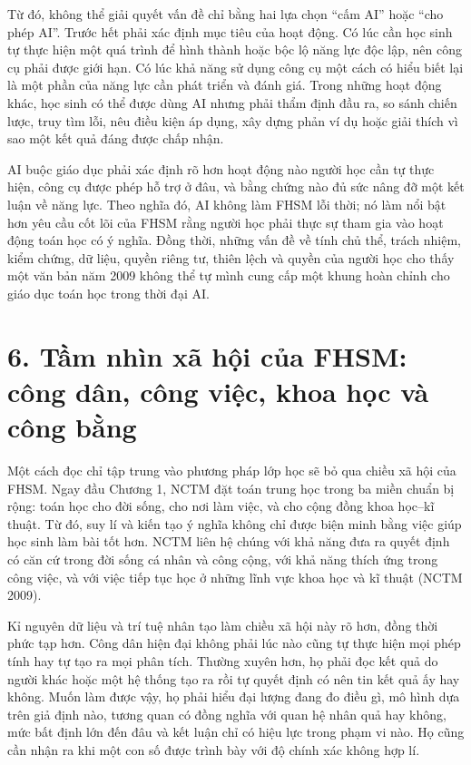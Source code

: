 Từ đó, không thể giải quyết vấn đề chỉ bằng hai lựa chọn ``cấm AI'' hoặc ``cho phép AI''. Trước hết phải xác định mục tiêu của hoạt động. Có lúc cần học sinh tự thực hiện một quá trình để hình thành hoặc bộc lộ năng lực độc lập, nên công cụ phải được giới hạn. Có lúc khả năng sử dụng công cụ một cách có hiểu biết lại là một phần của năng lực cần phát triển và đánh giá. Trong những hoạt động khác, học sinh có thể được dùng AI nhưng phải thẩm định đầu ra, so sánh chiến lược, truy tìm lỗi, nêu điều kiện áp dụng, xây dựng phản ví dụ hoặc giải thích vì sao một kết quả đáng được chấp nhận.

AI buộc giáo dục phải xác định rõ hơn hoạt động nào người học cần tự thực hiện, công cụ được phép hỗ trợ ở đâu, và bằng chứng nào đủ sức nâng đỡ một kết luận về năng lực. Theo nghĩa đó, AI không làm FHSM lỗi thời; nó làm nổi bật hơn yêu cầu cốt lõi của FHSM rằng người học phải thực sự tham gia vào hoạt động toán học có ý nghĩa. Đồng thời, những vấn đề về tính chủ thể, trách nhiệm, kiểm chứng, dữ liệu, quyền riêng tư, thiên lệch và quyền của người học cho thấy một văn bản năm 2009 không thể tự mình cung cấp một khung hoàn chỉnh cho giáo dục toán học trong thời đại AI.

{}
\section*{6. Tầm nhìn xã hội của FHSM: công dân, công việc, khoa học và công bằng}

Một cách đọc chỉ tập trung vào phương pháp lớp học sẽ bỏ qua chiều xã hội của FHSM. Ngay đầu Chương 1, NCTM đặt toán trung học trong ba miền chuẩn bị rộng: toán học cho đời sống, cho nơi làm việc, và cho cộng đồng khoa học--kĩ thuật. Từ đó, suy lí và kiến tạo ý nghĩa không chỉ được biện minh bằng việc giúp học sinh làm bài tốt hơn. NCTM liên hệ chúng với khả năng đưa ra quyết định có căn cứ trong đời sống cá nhân và công cộng, với khả năng thích ứng trong công việc, và với việc tiếp tục học ở những lĩnh vực khoa học và kĩ thuật (NCTM 2009).

Kỉ nguyên dữ liệu và trí tuệ nhân tạo làm chiều xã hội này rõ hơn, đồng thời phức tạp hơn. Công dân hiện đại không phải lúc nào cũng tự thực hiện mọi phép tính hay tự tạo ra mọi phân tích. Thường xuyên hơn, họ phải đọc kết quả do người khác hoặc một hệ thống tạo ra rồi tự quyết định có nên tin kết quả ấy hay không. Muốn làm được vậy, họ phải hiểu đại lượng đang đo điều gì, mô hình dựa trên giả định nào, tương quan có đồng nghĩa với quan hệ nhân quả hay không, mức bất định lớn đến đâu và kết luận chỉ có hiệu lực trong phạm vi nào. Họ cũng cần nhận ra khi một con số được trình bày với độ chính xác không hợp lí.

